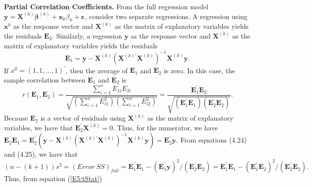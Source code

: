 \textbf{Partial Correlation Coefficients.} From the full regression
model $ \mathbf{y}=\mathbf{X}^{(k)}\boldsymbol
\beta^{(k)}+\mathbf{x}_{k}\beta_{k}+\boldsymbol \varepsilon$,
consider two separate regressions. A regression using
$\mathbf{x}^{k}$ as the response vector and $\mathbf{X}^{(k)}$ as
the matrix of explanatory variables yields the residuals
$\mathbf{E}_2$. Similarly, a regression $\mathbf{y}$ as the response
vector and $\mathbf{X}^{(k)}$ as the matrix of explanatory variables
yields the residuals
\begin{equation*}
\mathbf{E}_1 = \mathbf{y} - \mathbf{X}^{(k)} \left(
\mathbf{X}^{(k)\prime} \mathbf{X}^{(k)}\right)^{-1} \mathbf{X}^{(k)}
\mathbf{y.}
\end{equation*}
If $x^{0}=(1,1,\ldots,1)^{\prime}$, then the average of $
\mathbf{E}_1$ and $\mathbf{E}_2$ is zero. In this case, the sample
correlation between $\mathbf{E}_1$ and $\mathbf{E}_2$ is
\begin{equation*}
r(\mathbf{E}_1,\mathbf{E}_2) = \frac{\sum_{i=1}^{n} E_{1i}
E_{2i}}{\sqrt{\left( \sum_{i=1}^{n} E_{i1}^2\right) \left(
\sum_{i=1}^{n} E_{i2}^2\right) }} = \frac{\mathbf{E}_1^{\prime}
\mathbf{E}_2}{\sqrt{\left( \mathbf{E}_1^{\prime}\mathbf{E}_1\right)
\left( \mathbf{E}_2^{\prime}\mathbf{E}_2 \right) }}.
\end{equation*}
Because $\mathbf{E}_2$ is a vector of residuals using $\mathbf{X}
^{(k)}$ as the matrix of explanatory variables, we have that
$\mathbf{E}_2^{\prime} \mathbf{X}^{(k)} = 0$. Thus, for the
numerator, we have
\newline $\mathbf{E}_2^{\prime}\mathbf{E}_1 =
\mathbf{E}_2^{\prime}\left( \mathbf{y}-\mathbf{X}^{(k)}\left(
\mathbf{X}^{(k)\prime }\mathbf{X}^{(k)}\right)
^{-1}\mathbf{X}^{(k)}\mathbf{y}\right)
=\mathbf{E}_2^{\prime}\mathbf{y.}$ From equations (4.24) and (4.25),
we have that
\begin{equation*}
(n-(k+1))s^2 = (Error~SS)_{full} = \mathbf{E}_1^{\prime}
\mathbf{E}_1 - \left( \mathbf{E}_1^{\prime}\mathbf{y}\right) ^2 /
\left( \mathbf{E}_2^{\prime}\mathbf{E}_2\right) =
\mathbf{E}_1^{\prime}\mathbf{E}_1 - \left( \mathbf{E}
_1^{\prime}\mathbf{E}_2\right) ^2/\left(
\mathbf{E}_2^{\prime}\mathbf{E}_2\right).
\end{equation*}
Thus, from equation (\ref{E5:tStat})
